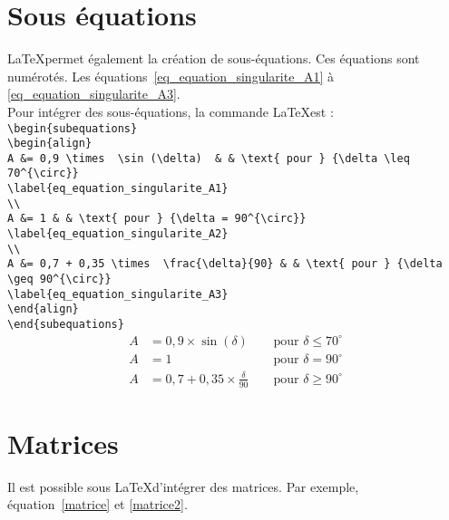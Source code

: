 \documentclass[a4paper,12pt]{report}
\begin{document}
\section{Sous équations}
\LaTeX permet également la création de sous-équations. Ces équations sont numérotés. Les équations~\ref{eq_equation_singularite_A1} à \ref{eq_equation_singularite_A3}. \\

Pour intégrer des sous-équations, la commande \LaTeX est : \\
\verb|\begin{subequations}| \\
\verb|\begin{align}| \\
\verb|A &= 0,9 \times  \sin (\delta)  & & \text{ pour } {\delta \leq 70^{\circ}}| \\
\verb|\label{eq_equation_singularite_A1}| \\
\verb|\\| \\
\verb|A &= 1 & & \text{ pour } {\delta = 90^{\circ}}| \\
\verb|\label{eq_equation_singularite_A2}| \\
\verb|\\| \\
\verb|A &= 0,7 + 0,35 \times  \frac{\delta}{90} & & \text{ pour } {\delta \geq 90^{\circ}}| \\
\verb|\label{eq_equation_singularite_A3}| \\
\verb|\end{align}| \\
\verb|\end{subequations} | \\

\begin{subequations}
\begin{align}
A &= 0,9 \times  \sin (\delta)  & & \text{ pour } {\delta \leq 70^{\circ}}
\label{eq_equation_singularite_A1}
\\
A &= 1 & & \text{ pour } {\delta = 90^{\circ}}
\label{eq_equation_singularite_A2}
\\
A &= 0,7 + 0,35 \times  \frac{\delta}{90} & & \text{ pour } {\delta \geq 90^{\circ}}
\label{eq_equation_singularite_A3}
\end{align}
\end{subequations} 



\section{Matrices}
Il est possible sous \LaTeX d'intégrer des matrices. Par exemple, équation~\ref{matrice} et \ref{matrice2}.
\end{document}
